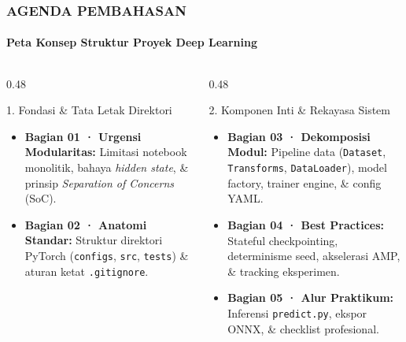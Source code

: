\documentclass[t,aspectratio=169,xcolor=dvipsnames]{beamer}
\begin{document}
\begin{frame}
  \frametitle{AGENDA PEMBAHASAN}
  \framesubtitle{Peta Konsep Struktur Proyek Deep Learning}

  \begin{columns}[t]
    \begin{column}{0.48\textwidth}
      \begin{block}{1. Fondasi \& Tata Letak Direktori}
        \footnotesize
        \begin{itemize}\setlength{\itemsep}{3pt}
          \item \textbf{Bagian 01 · Urgensi Modularitas:} Limitasi notebook monolitik, bahaya \textit{hidden state}, \& prinsip \textit{Separation of Concerns} (SoC).
          \item \textbf{Bagian 02 · Anatomi Standar:} Struktur direktori PyTorch (\texttt{configs}, \texttt{src}, \texttt{tests}) \& aturan ketat \texttt{.gitignore}.
        \end{itemize}
      \end{block}
    \end{column}

    \begin{column}{0.48\textwidth}
      \begin{block}{2. Komponen Inti \& Rekayasa Sistem}
        \footnotesize
        \begin{itemize}\setlength{\itemsep}{3pt}
          \item \textbf{Bagian 03 · Dekomposisi Modul:} Pipeline data (\texttt{Dataset}, \texttt{Transforms}, \texttt{DataLoader}), model factory, trainer engine, \& config YAML.
          \item \textbf{Bagian 04 · Best Practices:} Stateful checkpointing, determinisme seed, akselerasi AMP, \& tracking eksperimen.
          \item \textbf{Bagian 05 · Alur Praktikum:} Inferensi \texttt{predict.py}, ekspor ONNX, \& checklist profesional.
        \end{itemize}
      \end{block}
    \end{column}
  \end{columns}
\end{frame}
\end{document}
